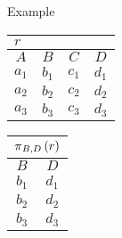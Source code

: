 \begin{multicols}{2}
\begin{CheatsheetEntryFrame}
        \SubsectionFrameAddSeparation
        \begin{RelAlgSubsection}{Example}
        \begin{center}
            {\footnotesize%
                \begin{tabular}{|cccc|}
                    \multicolumn{4}{l}{\normalsize $r$}
                        \\ \hline
                    \multicolumn{1}{|c}{$A$}
                        & \multicolumn{1}{c}{$B$}
                        & \multicolumn{1}{c}{$C$}
                        & \multicolumn{1}{c|}{$D$}
                        \\ \hline\hline
                    $a_1$ & $b_1$ & $c_1$ & $d_1$ \\
                    $a_2$ & $b_2$ & $c_2$ & $d_2$ \\
                    $a_3$ & $b_3$ & $c_3$ & $d_3$ \\ \hline
                \end{tabular}
                \qquad \qquad
                \begin{tabular}{|cc|}
                    \multicolumn{2}{l}{\normalsize $\operatorname{\pi}_{B, D}{(r)}$}
                        \\ \hline
                    \multicolumn{1}{|c}{$B$}
                        & \multicolumn{1}{c|}{$D$}
                        \\ \hline\hline
                    $b_1$ & $d_1$ \\
                    $b_2$ & $d_2$ \\
                    $b_3$ & $d_3$ \\ \hline
                \end{tabular}
            }
        \end{center}
        \end{RelAlgSubsection}

    \end{CheatsheetEntryFrame}
    
\end{multicols}

